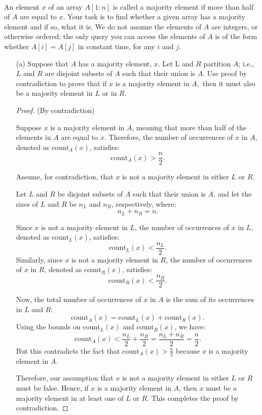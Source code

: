 \documentclass[12pt]{article}
\newcommand{\vs}{\vspace{2mm}}
\begin{document}
\vs\

An element $x$ of an array $A[1 : n]$ is called a majority element if more than half of $A$ are equal to $x$. Your task is to find whether a given array has a majority element and if so, what it is. We do not assume the elements of $A$ are integers, or otherwise ordered; the only query you can access the elements of $A$ is of the form whether $A[i] = A[j]$ in constant time, for any $i$ and $j$.  

\begin{itemize}
\item[(a)]  Suppose that $A$ has a majority element, $x$. Let L and $R$ partition $A$; i.e., $L$ and $R$ are disjoint subsets of $A$ such that their union is $A.$ Use proof by contradiction to prove that if $x$ is a majority element in $A,$ then it must also be a majority element in $L$ or in $R.$

\begin{proof} (By contradiction)

Suppose $x$ is a majority element in $A$, meaning that more than half of the elements in $A$ are equal to $x$. Therefore, the number of occurrences of $x$ in $A$, denoted as $\text{count}_A(x)$, satisfies:
\[
\text{count}_A(x) > \frac{n}{2}.
\]

Assume, for contradiction, that $x$ is not a majority element in either $L$ or $R$.

Let $L$ and $R$ be disjoint subsets of $A$ such that their union is $A$, and let the sizes of $L$ and $R$ be $n_L$ and $n_R$, respectively, where:
\[
n_L + n_R = n.
\]

Since $x$ is not a majority element in $L$, the number of occurrences of $x$ in $L$, denoted as $\text{count}_L(x)$, satisfies:
\[
\text{count}_L(x) < \frac{n_L}{2}.
\]
Similarly, since $x$ is not a majority element in $R$, the number of occurrences of $x$ in $R$, denoted as $\text{count}_R(x)$, satisfies:
\[
\text{count}_R(x) < \frac{n_R}{2}.
\]

Now, the total number of occurrences of $x$ in $A$ is the sum of its occurrences in $L$ and $R$:
\[
\text{count}_A(x) = \text{count}_L(x) + \text{count}_R(x).
\]
Using the bounds on $\text{count}_L(x)$ and $\text{count}_R(x)$, we have:
\[
\text{count}_A(x) < \frac{n_L}{2} + \frac{n_R}{2} = \frac{n_L + n_R}{2} = \frac{n}{2}.
\]
But this contradicts the fact that $\text{count}_A(x) > \frac{n}{2}$ because $x$ is a majority element in $A$.

Therefore, our assumption that $x$ is not a majority element in either $L$ or $R$ must be false. Hence, if $x$ is a majority element in $A$, then $x$ must be a majority element in at least one of $L$ or $R$. This completes the proof by contradiction.


\end{proof}
\end{itemize}
\end{document}
